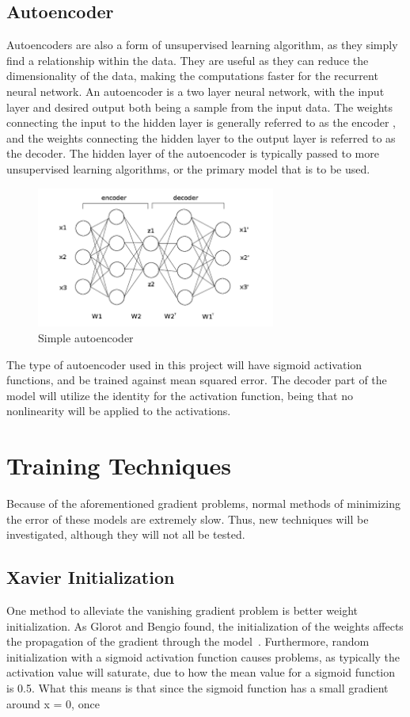 \documentclass{article}
\begin{document}
\subsection{Autoencoder}
Autoencoders are also a form of unsupervised learning algorithm, as they simply
find a relationship within the data. They are useful as they can reduce the
dimensionality of the data, making the computations faster for the recurrent
neural network. An autoencoder is a two layer neural network, with the input
layer and desired output both being a sample from the input data. The weights
connecting the input to the hidden layer is generally referred to as the encoder
, and the weights connecting the hidden layer to the output layer is referred to
as the decoder. The hidden layer of the autoencoder is typically passed to more
unsupervised learning algorithms, or the primary model that is to be used.

\begin{figure}[H]
	\centering
	\caption{Simple autoencoder}
	\includegraphics[width=0.7\textwidth]{autoencoderDiagram.jpg}
\end{figure}

The type of autoencoder used in this project will have sigmoid activation
functions, and be trained against mean squared error. The decoder part of the
model will utilize the identity for the activation function, being that no
nonlinearity will be applied to the activations.

\section{Training Techniques}
Because of the aforementioned gradient problems, normal methods of minimizing
the error of these models are extremely slow. Thus, new techniques will be
investigated, although they will not all be tested.

\subsection{Xavier Initialization}
One method to alleviate the vanishing gradient problem is better weight
initialization. As Glorot and Bengio found, the initialization of the weights
affects the propagation of the gradient through the model~\cite{xavier}.
Furthermore, random initialization with a sigmoid activation function causes
problems, as typically the activation value will saturate, due to how the mean
value for a sigmoid function is 0.5. What this means is that since the sigmoid
function has a small gradient around x = 0, once
\end{document}
